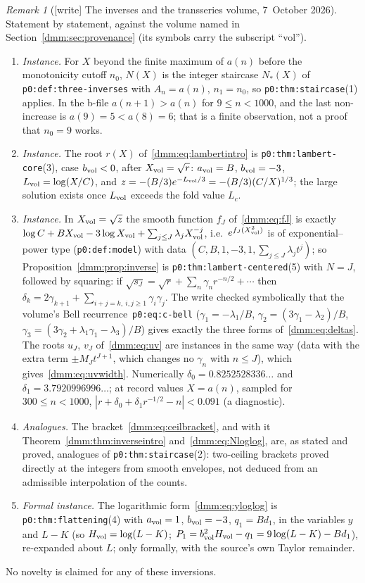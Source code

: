 \documentclass[11pt,letterpaper]{article}
\numberwithin{equation}{section}
\theoremstyle{definition}\newtheorem{definition}[theorem]{Definition}
\theoremstyle{remark}\newtheorem{remark}[theorem]{Remark}
\newcommand{\file}[1]{\nolinkurl{#1}}
\begin{document}
\begin{remark}[{[write]} The inverses and the transseries volume, 7~October 2026]\label{dmm:rem:transseries}
Statement by statement, against the volume named in
Section~\ref{dmm:sec:provenance} (its symbols carry the subscript ``vol'').
\begin{enumerate}[label=(\alph*),leftmargin=*]
\item \emph{Instance.} For $X$ beyond the finite maximum of $a(n)$ before
the monotonicity cutoff $n_0$, $N(X)$ is the integer staircase $N_*(X)$ of
\file{p0:def:three-inverses} with $A_n=a(n)$, $n_1=n_0$, so
\file{p0:thm:staircase}(1) applies. In the b-file $a(n+1)>a(n)$ for
$9\le n<1000$, and the last non-increase is $a(9)=5<a(8)=6$; that is a
finite observation, not a proof that $n_0=9$ works.
\item \emph{Instance.} The root $r(X)$ of~\eqref{dmm:eq:lambertintro} is
\file{p0:thm:lambert-core}(3), case $b_{\rm vol}<0$, after
$X_{\rm vol}=\sqrt r$: $a_{\rm vol}=B$, $b_{\rm vol}=-3$,
$L_{\rm vol}=\log(X/C)$, and $z=-(B/3)e^{-L_{\rm vol}/3}=-(B/3)(C/X)^{1/3}$;
the large solution exists once $L_{\rm vol}$ exceeds the fold value $L_c$.
\item \emph{Instance.} In $X_{\rm vol}=\sqrt z$ the smooth function $f_J$
of~\eqref{dmm:eq:fJ} is exactly $\log C+BX_{\rm vol}-3\log X_{\rm vol}+
\sum_{j\le J}\lambda_jX_{\rm vol}^{-j}$, i.e.\ $e^{f_J(X_{\rm vol}^2)}$ is of
exponential--power type (\file{p0:def:model}) with data
$(C,B,1,-3,1,\sum_{j\le J}\lambda_jt^j)$; so
Proposition~\ref{dmm:prop:inverse} is \file{p0:thm:lambert-centered}(5) with
$N=J$, followed by squaring: if
$\sqrt{s_J}=\sqrt r+\sum_n\gamma_nr^{-n/2}+\cdots$ then
$\delta_k=2\gamma_{k+1}+\sum_{i+j=k,\ i,j\ge1}\gamma_i\gamma_j$. The write
checked symbolically that the volume's Bell recurrence~\file{p0:eq:c-bell}
($\gamma_1=-\lambda_1/B$, $\gamma_2=(3\gamma_1-\lambda_2)/B$,
$\gamma_3=(3\gamma_2+\lambda_1\gamma_1-\lambda_3)/B$) gives exactly the three
forms of~\eqref{dmm:eq:deltas}. The roots $u_J$, $v_J$ of~\eqref{dmm:eq:uv}
are instances in the same way (data with the extra term
$\pm M_Jt^{J+1}$, which changes no $\gamma_n$ with $n\le J$), which
gives~\eqref{dmm:eq:uvwidth}. Numerically $\delta_0=0.8252528336\ldots$ and
$\delta_1=3.7920996996\ldots$; at record values $X=a(n)$, sampled for
$300\le n<1000$, $|r+\delta_0+\delta_1r^{-1/2}-n|<0.091$ (a diagnostic).
\item \emph{Analogues.} The bracket~\eqref{dmm:eq:ceilbracket}, and with it
Theorem~\ref{dmm:thm:inverseintro} and~\eqref{dmm:eq:Nloglog}, are, as
stated and proved, analogues of \file{p0:thm:staircase}(2): two-ceiling
brackets proved directly at the integers from smooth envelopes, not deduced
from an admissible interpolation of the counts.
\item \emph{Formal instance.} The logarithmic form~\eqref{dmm:eq:yloglog}
is \file{p0:thm:flattening}(4) with $a_{\rm vol}=1$, $b_{\rm vol}=-3$,
$q_1=Bd_1$, in the variables $y$ and $L-K$ (so $H_{\rm vol}=\log(L-K)$;
$P_1=b_{\rm vol}^2H_{\rm vol}-q_1=9\log(L-K)-Bd_1$), re-expanded about $L$;
only formally, with the source's own Taylor remainder.
\end{enumerate}
No novelty is claimed for any of these inversions.
\end{remark}
\end{document}
